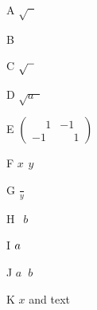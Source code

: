 \documentclass{article}
\begin{document}
A $\sqrt{\phantom{x}}$

B $\phantom{x}$

C $\sqrt{\hphantom{x}}$

D $\sqrt{a\phantom{x}}$

E $\begin{pmatrix}\phantom{-}1 & -1\\ -1 & \phantom{-}1\end{pmatrix}$

F $x^{\phantom{2}}y$

G $\frac{\phantom{x}}{y}$

H ${}^{\phantom{a}}b$

I $\vphantom{\int}a$

J $a\phantom{x}b$

K $\phantom{}x$ and text {\phantom{text}}
\end{document}
